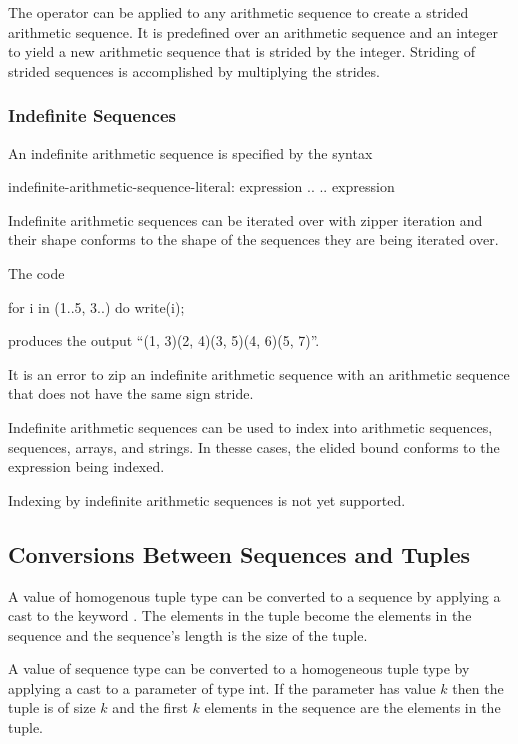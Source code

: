 The  operator can be applied to any arithmetic sequence to
create a strided arithmetic sequence.  It is predefined over an
arithmetic sequence and an integer to yield a new arithmetic sequence
that is strided by the integer.  Striding of strided sequences is
accomplished by multiplying the strides.

\subsubsection{Indefinite Sequences}
\label{Indefinite_Sequences}

An indefinite arithmetic sequence is specified by the syntax
\begin{syntax}
indefinite-arithmetic-sequence-literal:
  expression ..
  .. expression
\end{syntax}

Indefinite arithmetic sequences can be iterated over with zipper
iteration and their shape conforms to the shape of the sequences they
are being iterated over.
\begin{example}
The code
\begin{chapel}
for i in (1..5, 3..) do
  write(i);
\end{chapel}
produces the output ``(1, 3)(2, 4)(3, 5)(4, 6)(5, 7)''.
\end{example}

It is an error to zip an indefinite arithmetic sequence with an
arithmetic sequence that does not have the same sign stride.

Indefinite arithmetic sequences can be used to index into arithmetic
sequences, sequences, arrays, and strings.  In thesse cases, the
elided bound conforms to the expression being indexed.
\begin{implementation}
Indexing by indefinite arithmetic sequences is not yet supported.
\end{implementation}

\subsection{Conversions Between Sequences and Tuples}
\label{Conversions_Between_Sequences_and_Tuples}

A value of homogenous tuple type can be converted to a sequence by
applying a cast to the keyword .  The elements in the tuple
become the elements in the sequence and the sequence's length is the
size of the tuple.

A value of sequence type can be converted to a homogeneous tuple type
by applying a cast to a parameter of type int.  If the parameter has
value $k$ then the tuple is of size $k$ and the first $k$ elements in
the sequence are the elements in the tuple.
